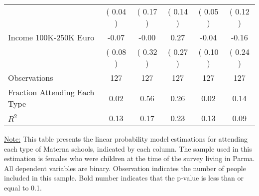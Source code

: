 \begin{table}[H]
{\begin{tabular}{lccccc}
\quad  & (     0.04 ) & (     0.17 )  & (     0.14 )  & (     0.05 ) & (     0.12 ) \\
\quad Income 100K-250K Euro &     -0.07 &     -0.00 &      0.27 &     -0.04 &     -0.16 \\
\quad  & (     0.08 ) & (     0.32 )  & (     0.27 )  & (     0.10 ) & (     0.24 ) \\
\midrule
Observations & 127 & 127 & 127 & 127 & 127 \\
Fraction Attending Each Type &      0.02 &      0.56 &      0.26 &      0.02 &      0.14 \\
\midrule
$ R^2$ &      0.13 &      0.17 &      0.23 &      0.13 &      0.09 \\
\bottomrule
\end{tabular}}
\end{table}
\begin{footnotesize}
\noindent\underline{Note:} This table presents the linear probability model estimations for attending each type of Materna schools, indicated by each column. The sample used in this estimation is females who were children at the time of the survey living in Parma. All dependent variables are binary. Observation indicates the number of people included in this sample. Bold number indicates that the p-value is less than or equal to 0.1.
\end{footnotesize}
